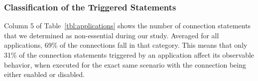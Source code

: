 

\subsubsection{Classification of the Triggered Statements}
Column 5 of Table~\ref{tbl:applications} shows the number of connection statements that we determined as non-essential during our study. 
Averaged for all applications, 69\% of the connections fall in that category. 
This means that only 31\% of the connection statements triggered by an application affect its observable behavior, 
when executed for the exact same scenario with the connection being either enabled or disabled.



